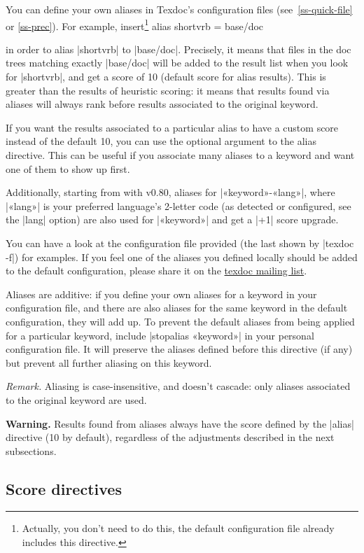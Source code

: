 \documentclass[a4paper,oneside]{scrartcl}
\makeatletter
\newenvironment{htcode}
  {\SaveVerbatim[samepage, gobble=2]{verbmat}}
  {
    \endSaveVerbatim
    \par\medskip\noindent\hspace*{\parindent}%
    \BUseVerbatim{verbmat}%
    \par\medskip\@endpetrue
  }
\newcommand\tdml{\href{http://lists.tug.org/texdoc}{texdoc mailing list}\xspace}
\makeatother
\begin{document}
You can define your own aliases in Texdoc's configuration files
(see~\ref{ss-quick-file} or \ref{ss-prec}). For example,
insert\footnote{Actually, you don't need to do this, the default configuration
  file already includes this directive.}
\begin{htcode}
  alias shortvrb = base/doc
\end{htcode}
in order to alias |shortvrb| to |base/doc|. Precisely, it means that files in
the doc trees matching exactly |base/doc| will be added to the result list
when you look for |shortvrb|, and get a score of 10 (default score for alias
results). This is greater than the results of heuristic scoring: it means that
results found via aliases will always rank before results associated to the
original keyword.

If you want the results associated to a particular alias to have a custom
score instead of the default 10, you can use the optional argument to the
alias directive. This can be useful if you associate many aliases to
a keyword and want one of them to show up first.

Additionally, starting from with v0.80, aliases for |«keyword»-«lang»|, where
|«lang»| is your preferred language's 2-letter code (as detected or
configured, see the |lang| option) are also used for |«keyword»| and get a
|+1| score upgrade.

You can have a look at the configuration file provided (the last shown by
|texdoc -f|) for examples. If you feel one of the aliases you defined locally
should be added to the default configuration, please share it on the \tdml.

Aliases are additive: if you define your own aliases for a keyword in your
configuration file, and there are also aliases for the same keyword in the
default configuration, they will add up. To prevent the default aliases
from being applied for a particular keyword, include |stopalias «keyword»| in
your personal configuration file. It will preserve the aliases defined before
this directive (if any) but prevent all further aliasing on this keyword.

\textit{Remark.} Aliasing is case-insensitive, and doesn't cascade:
only aliases associated to the original keyword are used.

\textbf{Warning.} Results found from aliases always have the score defined by
the |alias| directive (10 by default), regardless of the adjustments described
in the next subsections.

\subsection{Score directives}\label{ss-score}
\end{document}
